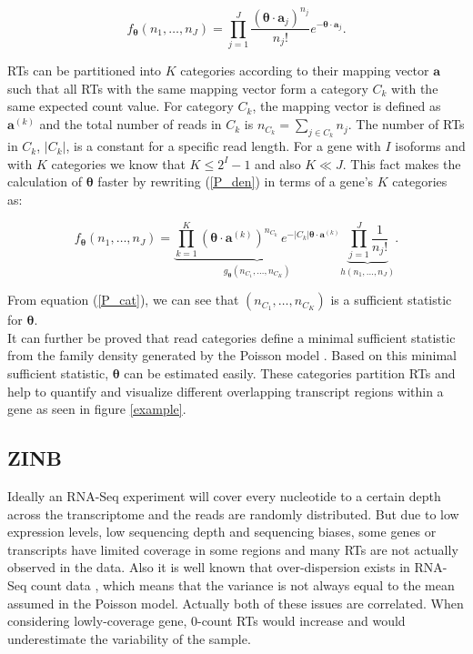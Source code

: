 \documentclass[11pt]{article}
\begin{document}
\begin{equation}
f_{\boldsymbol{\theta}}(n_1,\ldots,n_J)=\prod_{j=1}^{J}\frac{(\boldsymbol{\theta}\cdot\mathbf{a}_j)^{n_j}}{n_j!}e^{-\boldsymbol{\theta}\cdot\mathbf{a}_j}.
\label{P_den}
\end{equation}

\noindent RTs can be partitioned into $K$ categories according to their mapping vector $\mathbf{a}$ such that all RTs with the same mapping vector form a category $C_k$ with the same expected count value. For category $C_k$, the mapping vector is defined as $\mathbf{a}^{(k)}$ and the total number of reads in $C_k$ is $n_{C_k}=\sum_{j\in C_k}n_j$. The number of RTs in $C_k$, $|C_k|$, is a constant for a specific read length. For a gene with $I$ isoforms and with $K$ categories we know that $K\leq2^I-1$ and also $K\ll J$.  This fact makes the calculation of $\boldsymbol{\theta}$ faster by rewriting (\ref{P_den}) in terms of a gene's $K$ categories as:

\begin{equation}
\label{P_cat}
f_{\boldsymbol{\theta}}(n_1,\ldots,n_J)=\underbrace{\prod_{k=1}^K{(\boldsymbol{\theta}\cdot\mathbf{a}^{(k)})^{n_{C_k}}\ e^{-|C_k|\boldsymbol{\theta}\cdot\mathbf{a}^{(k)}}}}_{g_{\boldsymbol{\theta}}(n_{C_1},\ldots,n_{C_K})}\underbrace{\prod_{j=1}^{J}\frac{1}{n_j!}}_{h(n_1,\ldots,n_J)}.
\end{equation}

\noindent From equation (\ref{P_cat}), we can see that $(n_{C_1},\ldots,n_{C_K})$ is a sufficient statistic for $\boldsymbol{\theta}$. \\
 
\noindent It can further be proved that read categories define a minimal sufficient statistic from the family density generated by the Poisson model \cite{salzman2011statistical}. Based on this minimal sufficient statistic, $\boldsymbol{\theta}$ can be estimated easily. These categories partition RTs and help to quantify and visualize different overlapping transcript regions within a gene as seen in figure \ref{example}.

\subsection{ZINB}
\label{zinb}

\noindent Ideally an RNA-Seq experiment will cover every nucleotide to a certain depth across the transcriptome and the reads are randomly distributed.  But due to low expression levels, low sequencing depth and sequencing biases, some genes or transcripts have limited coverage in some regions and many RTs are not actually observed in the data.  %
Also it is well known that over-dispersion exists in RNA-Seq count data \cite{anders2010differential}, which means that the variance is not always equal to the mean assumed in the Poisson model. Actually both of these issues are correlated. When considering lowly-coverage gene, 0-count RTs would increase and would underestimate the variability of the sample.  \\
\end{document}
